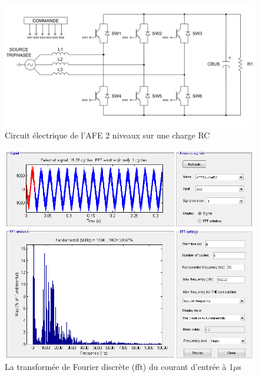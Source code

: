 \begin{figure}[htb]
\centering
\includegraphics[scale=0.6]{fig/AFE_2L_RC.png}
\caption{Circuit électrique de l'AFE 2 niveaux sur une charge RC}
\label{circuit_AFE_2L_RC}
\end{figure}


\begin{figure}[htb]
\centering
\includegraphics[scale=0.5]{fig/AFERC/FFTAnalysisToolResult5u.png}
\caption{La transformée de Fourier discrète (fft) du courant d'entrée à 1$\mu$s}
\label{fft_RC}
\end{figure}


